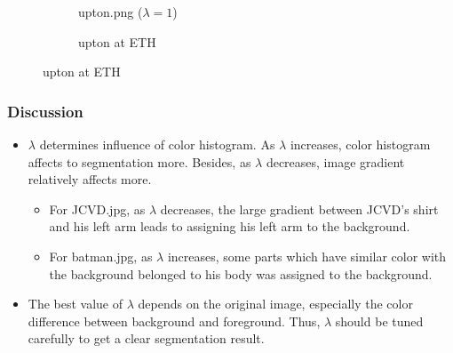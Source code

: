\documentclass[paper=a4, fontsize=11pt]{scrartcl} %
\numberwithin{equation}{section} %
\numberwithin{figure}{section} %
\numberwithin{table}{section} %
\begin{document}
\begin{figure}[H]
\begin{subfigure}[b]{0.3\textwidth}
{		}
	\caption{upton.png ($\lambda = 1$)}
	\end{subfigure}
	\begin{subfigure}[b]{0.3\textwidth}
		\noindent{}
	\caption{upton at ETH}
	\end{subfigure}
\end{figure}


\subsubsection{Discussion}

\begin{itemize}
	\item $\lambda$ determines influence of color histogram. As $\lambda$ increases, color histogram affects to segmentation more. Besides, as $\lambda$ decreases, image gradient relatively affects more. 
		\begin{itemize}
			\item For JCVD.jpg, as $\lambda$ decreases, the large gradient between JCVD's shirt and his left arm leads to assigning his left arm to the background.   
			\item For batman.jpg, as $\lambda$ increases, some parts which have similar color with the background belonged to his body was assigned to the background.
		\end{itemize}
	\item The best value of $\lambda$ depends on the original image, especially the color difference between background and foreground. Thus, $\lambda$ should be tuned carefully to get a clear segmentation result. 
\end{itemize}


 

\end{document}

